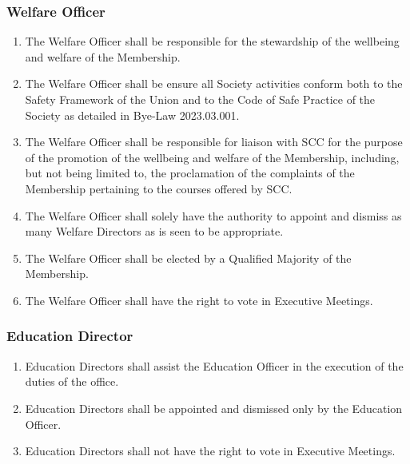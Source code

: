 \documentclass{scrartcl}
\begin{document}
            \subsubsection{Welfare Officer}
                \label{executive--positions--welfare-officer}
                \begin{enumerate}
                    \item The Welfare Officer shall be responsible for the stewardship of the wellbeing and welfare of the Membership.
                    \item The Welfare Officer shall be ensure all Society activities conform both to the Safety Framework of the Union and to the Code of Safe Practice of the Society as detailed in Bye-Law 2023.03.001.
                    \item The Welfare Officer shall be responsible for liaison with SCC for the purpose of the promotion of the wellbeing and welfare of the Membership, including, but not being limited to, the proclamation of the complaints of the Membership pertaining to the courses offered by SCC.
                    \item The Welfare Officer shall solely have the authority to appoint and dismiss as many Welfare Directors as is seen to be appropriate.
                    \item The Welfare Officer shall be elected by a Qualified Majority of the Membership.
                    \item The Welfare Officer shall have the right to vote in Executive Meetings.
                \end{enumerate}

            \subsubsection{Education Director}
                \label{executive--positions--education-director}
                \begin{enumerate}
                    \item Education Directors shall assist the Education Officer in the execution of the duties of the office.
                    \item Education Directors shall be appointed and dismissed only by the Education Officer.
                    \item Education Directors shall not have the right to vote in Executive Meetings.
                \end{enumerate}
\end{document}
